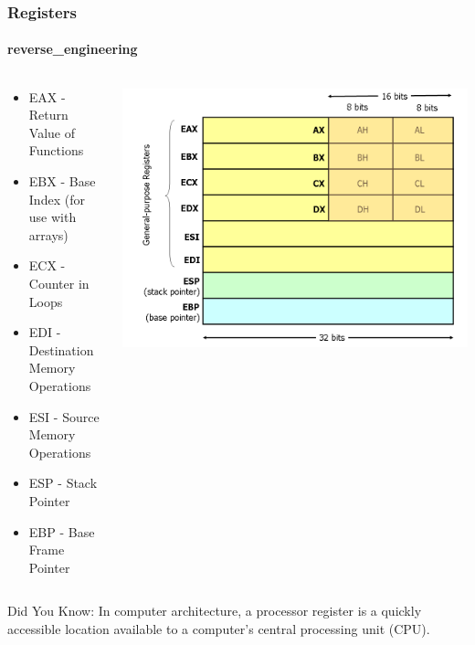 \documentclass[aspectratio=169]{beamer}
\begin{document}
\begin{frame}
  \frametitle{Registers}
  \framesubtitle{reverse\_engineering}
  \begin{columns}
    \begin{column}{.50\textwidth}
      \begin{itemize}
      \item{EAX - Return Value of Functions}
      \item{EBX - Base Index (for use with arrays)}
      \item{ECX - Counter in Loops}
      \item{EDI - Destination Memory Operations}
      \item{ESI - Source Memory Operations}
      \item{ESP - Stack Pointer}
      \item{EBP - Base Frame Pointer}
      \end{itemize}
    \end{column}
    \hfill
    \begin{column}{.50\textwidth}
      \begin{center}
        \includegraphics[scale=0.25]{x86-registers}
      \end{center}
    \end{column}
  \end{columns}
  \bigskip
  Did You Know: In computer architecture, a processor register is a quickly accessible location available to a computer's central processing unit (CPU).
\end{frame}
\end{document}
